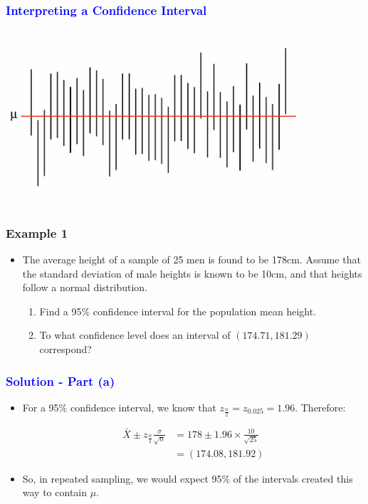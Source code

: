 \documentclass[12pt]{beamer}
\begin{document}
\begin{frame}
	\frametitle{\textcolor{blue}{Interpreting a Confidence Interval}}
	\centering
\includegraphics[width=11cm]{interval.png}

	
\end{frame}
\begin{frame}
	\frametitle{Example 1}
	\begin{itemize}[label={\color{blue}$\blacktriangleright$}]
	\item The average height of a sample of 25 men is found to be 178cm. Assume that the standard deviation of male heights is known to be 10cm, and that heights follow a normal distribution.
	
		\begin{enumerate}[label=\textcolor{blue}{(\alph*)}]
		\item Find a 95\% confidence interval for the population mean height.
		\item To what confidence level does an interval of $(174.71, 181.29)$ correspond?
	\end{enumerate}
\end{itemize}
	
\end{frame}

\begin{frame}
	\frametitle{\textcolor{blue}{Solution - Part (a)}}
	
	\begin{itemize}[label={\color{blue}$\blacktriangleright$}]
		\item For a 95\% confidence interval, we know that 
		$z_{\frac{\alpha}{2}} = z_{0.025} = 1.96$. Therefore:
		
		
		\begin{align*}
			\bar{X} \pm z_{\frac{\alpha}{2}}\frac{\sigma}{\sqrt{n}} &= 178 \pm 1.96 \times \frac{10}{\sqrt{25}} \\
			&= (174.08, 181.92)
		\end{align*}
		
		
		\item So, in repeated sampling, we would expect 95\% of the intervals created this way to contain $\mu$.
	\end{itemize}
	
\end{frame}
\end{document}
